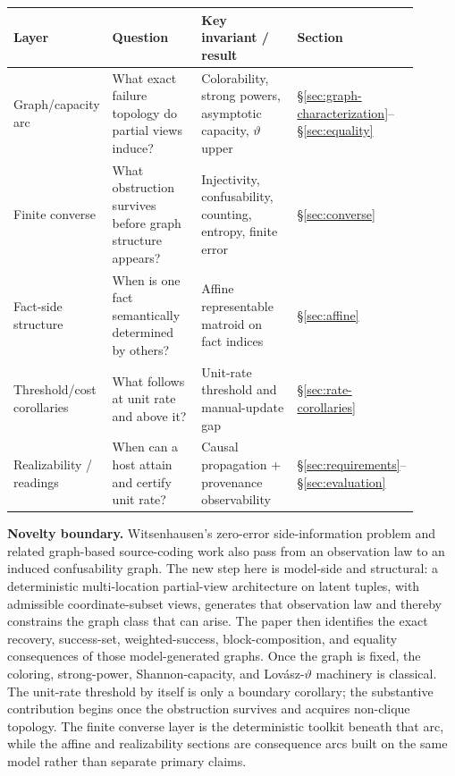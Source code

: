 \begingroup
\small
\setlength{\tabcolsep}{4pt}
\renewcommand{\arraystretch}{1.1}
\begin{center}
\begin{tabularx}{0.98\linewidth}{@{}>{\RaggedRight\arraybackslash}p{0.18\linewidth}>{\RaggedRight\arraybackslash}p{0.28\linewidth}>{\RaggedRight\arraybackslash}p{0.31\linewidth}>{\RaggedRight\arraybackslash}p{0.13\linewidth}@{}}
\toprule
\textbf{Layer} & \textbf{Question} & \textbf{Key invariant / result} & \textbf{Section} \\
\midrule
Graph/capacity arc & What exact failure topology do partial views induce? & Colorability, strong powers, asymptotic capacity, $\vartheta$ upper & \S\ref{sec:graph-characterization}--\S\ref{sec:equality} \\
Finite converse & What obstruction survives before graph structure appears? & Injectivity, confusability, counting, entropy, finite error & \S\ref{sec:converse} \\
Fact-side structure & When is one fact semantically determined by others? & Affine representable matroid on fact indices & \S\ref{sec:affine} \\
Threshold/cost corollaries & What follows at unit rate and above it? & Unit-rate threshold and manual-update gap & \S\ref{sec:rate-corollaries} \\
Realizability / readings & When can a host attain and certify unit rate? & Causal propagation + provenance observability & \S\ref{sec:requirements}--\S\ref{sec:evaluation} \\
\bottomrule
\end{tabularx}
\end{center}
\endgroup

\medskip
\noindent\textbf{Novelty boundary.} Witsenhausen's zero-error side-information problem and related graph-based source-coding work also pass from an observation law to an induced confusability graph. The new step here is model-side and structural: a deterministic multi-location partial-view architecture on latent tuples, with admissible coordinate-subset views, generates that observation law and thereby constrains the graph class that can arise. The paper then identifies the exact recovery, success-set, weighted-success, block-composition, and equality consequences of those model-generated graphs. Once the graph is fixed, the coloring, strong-power, Shannon-capacity, and Lov\'asz-$\vartheta$ machinery is classical. The unit-rate threshold by itself is only a boundary corollary; the substantive contribution begins once the obstruction survives and acquires non-clique topology. The finite converse layer is the deterministic toolkit beneath that arc, while the affine and realizability sections are consequence arcs built on the same model rather than separate primary claims.

